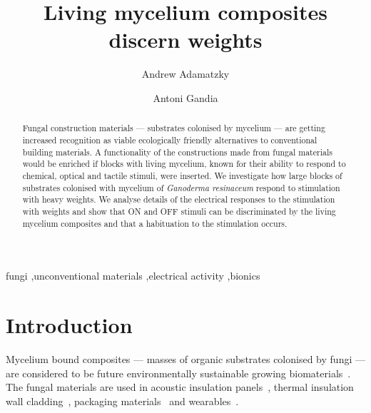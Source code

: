 \documentclass[]{elsarticle}
\begin{document}
\begin{frontmatter}

\title{Living mycelium composites discern weights}

\author[1]{Andrew Adamatzky}
\author[2]{Antoni Gandia}

\address[1]{Unconventional Computing Laboratory, UWE, Bristol, UK}
\address[2]{Institute for Plant Molecular and Cell Biology, CSIC-UPV, Valencia, ES}


\begin{abstract}
Fungal construction materials --- substrates colonised by mycelium --- are getting increased recognition as viable ecologically friendly alternatives to conventional building materials. A functionality of the constructions made from fungal materials would be enriched if blocks with living mycelium, known for their ability to respond to chemical,  optical and tactile stimuli, were inserted. We investigate how large blocks of substrates colonised with mycelium of \emph{Ganoderma resinaceum} respond to stimulation with heavy weights. We analyse details of the electrical responses to the stimulation with weights and show that ON and OFF stimuli can be discriminated by the living mycelium composites and that a habituation to the stimulation occurs. 
\end{abstract}

\begin{keyword}
fungi \sep unconventional materials \sep electrical activity \sep bionics
\end{keyword}

\end{frontmatter}


\section{Introduction}

Mycelium bound composites --- masses of organic substrates colonised by fungi --- are considered to be future environmentally sustainable growing biomaterials~\cite{karana2018material,jones2020engineered,cerimi2019fungi}. The fungal materials are used in acoustic insulation panels~\cite{pelletier2013evaluation,elsacker2020comprehensive,robertson2020fungal}, thermal insulation wall cladding~\cite{yang2017physical,xing2018growing,girometta2019physico,dias2021investigation,wang2016experimental,cardenas2020thermal}, packaging materials~\cite{holt2012fungal,sivaprasad2021development,mojumdar2021mushroom} and wearables~\cite{adamatzky2021reactive,silverman2020development,karana2018material,appels2020use,jones2020leather}. 
\end{document}
